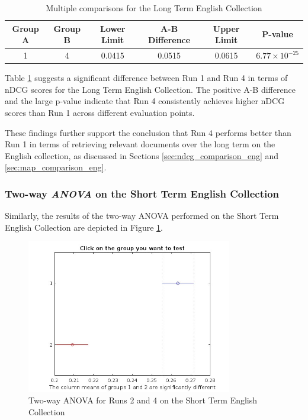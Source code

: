 \begin{table}[!h]
    \centering
    \caption{Multiple comparisons for the Long Term English Collection}
    \label{table:lt_anova_eng}
    \begin{tabular}{cccccc}
    \hline
    Group A & Group B & Lower Limit & A-B Difference & Upper Limit & P-value \\
    \hline
    1 & 4 & 0.0415 & 0.0515 & 0.0615 & $6.77 \times 10^{-25}$ \\
    \hline
    \end{tabular}
\end{table}
    
Table \ref{table:lt_anova_eng} suggests a significant difference between Run 1 and Run 4 in terms of \ac{nDCG} scores for the Long Term English Collection. 
The positive A-B difference and the large p-value indicate that Run 4 consistently achieves higher \ac{nDCG} scores than Run 1 across different evaluation points.

These findings further support the conclusion that Run 4 performs better than Run 1 in terms of retrieving relevant documents over the long term on the English collection, as discussed in Sections \ref{sec:ndcg_comparison_eng} and \ref{sec:map_comparison_eng}.

\subsubsection{Two-way \textit{ANOVA} on the Short Term English Collection}

Similarly, the results of the two-way \ac{ANOVA} performed on the Short Term English Collection are depicted in Figure \ref{fig:st_anova_eng}.

\begin{figure}[!h]
\centering
\includegraphics[width=0.8\textwidth]{figure/StatisticalAnalysis/AnovaTwoWay/ST_EN.jpg}
\caption{Two-way ANOVA for Runs 2 and 4 on the Short Term English Collection}
\label{fig:st_anova_eng}
\end{figure}

